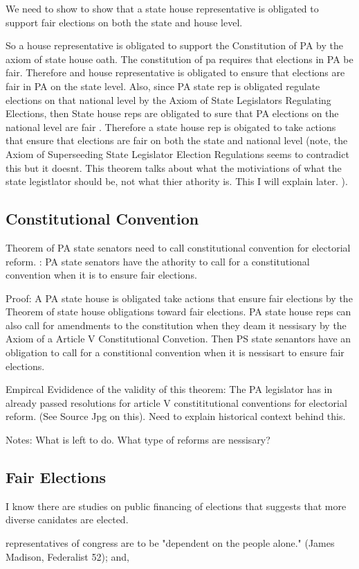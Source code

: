 \documentclass[11pt]{article} %
\begin{document}
\begin{enumerate}
We need to show to show that a state house representative is obligated to support fair elections on both the state and house level. 

So a house representative is obligated to support the Constitution of PA by the axiom of state house oath.  The constitution of pa requires that elections in PA be fair.  Therefore and house representative is obligated to ensure that elections are fair in PA on the state level.  Also, since PA state rep is obligated regulate elections on that national level by the Axiom of State Legislators Regulating Elections, then State house reps are obligated to sure that PA elections on the national level are fair . Therefore a state house rep is obigated to take actions that ensure that elections are fair on both the state and national level (note, the Axiom of Superseeding State Legislator Election Regulations seems to contradict this but it doesnt.  This theorem talks about what the motiviations of what the state legistlator should be, not what thier athority is.  This I will explain later. ). 


\subsection{Constitutional Convention}

Theorem of  PA state senators need to call constitutional convention for electorial reform. : PA state senators have the athority to call for a constitutional convention when it is to ensure fair elections.

Proof:  A PA state house is obligated take actions that ensure fair elections by the Theorem of state house obligations toward fair elections.  PA state house reps can also call for amendments to the constitution when they deam it nessisary by the Axiom of a Article V Constitutional Convetion.  Then PS state senantors have an obligation to call for a constitional convention when it is nessisart to ensure fair elections. 

Empircal Evididence of the validity of this theorem:   The PA legislator has in already passed resolutions for article V constititutional conventions for electorial reform.   (See Source Jpg on this).   Need to explain historical context behind this. 

Notes: What is left to do.  What type of reforms are nessisary?  


\subsection{Fair Elections}

I know there are studies on public financing of elections that suggests that more diverse canidates are elected. 

representatives of congress are to be "dependent on the people alone." (James Madison, Federalist 52);
 	and,



\end{enumerate}
\end{document}
